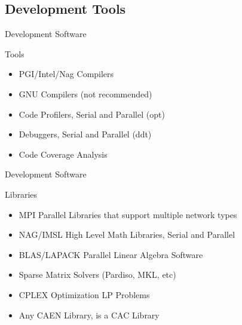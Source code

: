 \documentclass[handout]{beamer}
\begin{document}
    \subsection {Development Tools}
     \begin{frame}{Development Software}
      \begin{block}{Tools}
       \begin{itemize}
         \item PGI/Intel/Nag Compilers
         \item GNU Compilers (not recommended)
         \item Code Profilers, Serial and Parallel (opt)
         \item Debuggers, Serial and Parallel (ddt)
         \item Code Coverage Analysis 
       \end{itemize}
      \end{block}
     \end{frame}
     \begin{frame}{Development Software}
      \begin{block}{Libraries}
        \begin{itemize}
         \item MPI Parallel Libraries that support multiple network types
         \item NAG/IMSL High Level Math Libraries, Serial and Parallel
         \item BLAS/LAPACK Parallel Linear Algebra Software
         \item Sparse Matrix Solvers (Pardiso, MKL, etc)
         \item CPLEX Optimization LP Problems
         \item Any CAEN Library, is a CAC Library
        \end{itemize}
      \end{block}
     \end{frame}
\end{document}
